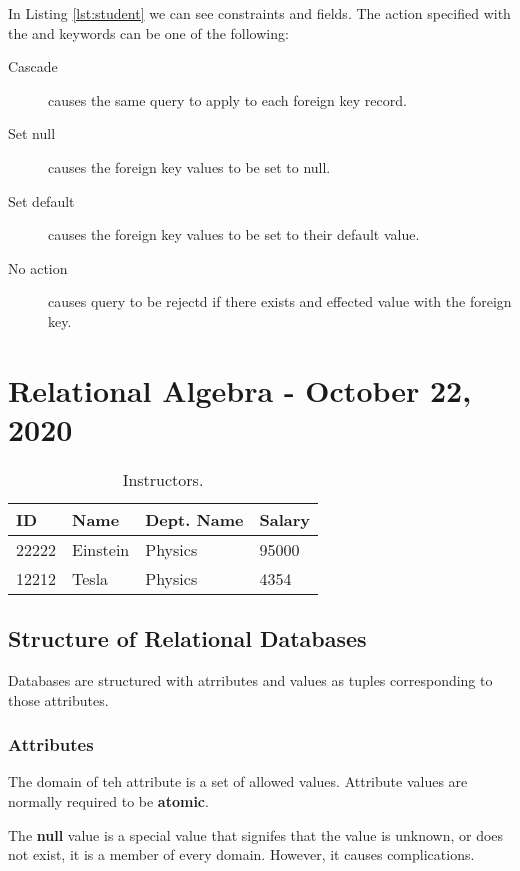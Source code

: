 \documentclass[11pt,a4paper,twocolumn]{book}
\begin{document}
In Listing \ref{lst:student} we can see constraints and fields. The action specified with the  and  keywords can be one of the following:

\begin{description}
\item[Cascade] causes the same query to apply to each foreign key record.
\item[Set null] causes the foreign key values to be set to null.
\item[Set default] causes the foreign key values to be set to their default value.
\item[No action] causes query to be rejectd if there exists and effected value with the foreign key.
\end{description}

\chapter{Relational Algebra - October 22, 2020}

\begin{table}[h]
    \centering
    \begin{tabular}{llll}
		ID & Name & Dept. Name & Salary\\
        \toprule
        22222 & Einstein & Physics & 95000\\
        12212 & Tesla & Physics & 4354\\
        \bottomrule
    \end{tabular}
    \caption{Instructors.}
    \label{tab:inst}
\end{table}

\section{Structure of Relational Databases}

Databases are structured with atrributes and values as tuples corresponding to those attributes.

\subsection{Attributes}
The domain of teh attribute is a set of allowed values. Attribute values are normally required to be \textbf{atomic}.

The \textbf{null} value is a special value that signifes that the value is unknown, or does not exist, it is a member of every domain. However, it causes complications.
\end{document}
